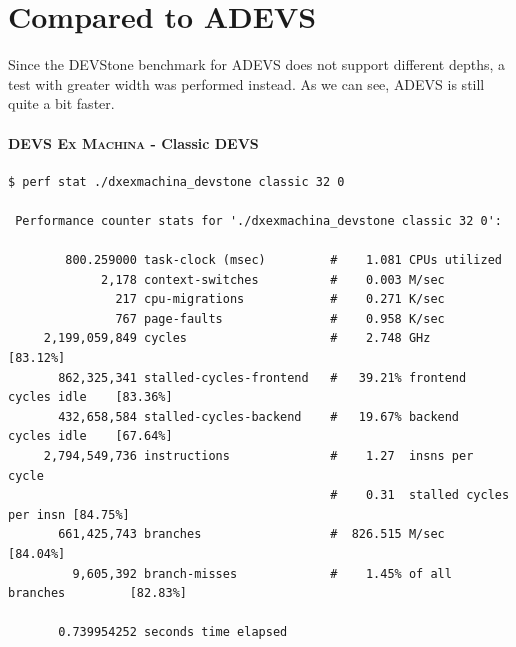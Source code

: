 \documentclass[8pt,a4paper]{report}
\begin{document}
\section{Compared to \textsc{ADEVS}}
Since the DEVStone benchmark for \textsc{ADEVS} does not support different depths, a test with greater width was performed instead. As we can see, \textsc{ADEVS} is still quite a bit faster.
\paragraph{\textsc{DEVS Ex Machina} - Classic DEVS}
\begin{Verbatim}[fontsize=\small]
$ perf stat ./dxexmachina_devstone classic 32 0

 Performance counter stats for './dxexmachina_devstone classic 32 0':

        800.259000 task-clock (msec)         #    1.081 CPUs utilized          
             2,178 context-switches          #    0.003 M/sec                  
               217 cpu-migrations            #    0.271 K/sec                  
               767 page-faults               #    0.958 K/sec                  
     2,199,059,849 cycles                    #    2.748 GHz                     [83.12%]
       862,325,341 stalled-cycles-frontend   #   39.21% frontend cycles idle    [83.36%]
       432,658,584 stalled-cycles-backend    #   19.67% backend  cycles idle    [67.64%]
     2,794,549,736 instructions              #    1.27  insns per cycle        
                                             #    0.31  stalled cycles per insn [84.75%]
       661,425,743 branches                  #  826.515 M/sec                   [84.04%]
         9,605,392 branch-misses             #    1.45% of all branches         [82.83%]

       0.739954252 seconds time elapsed
\end{Verbatim}
\end{document}

